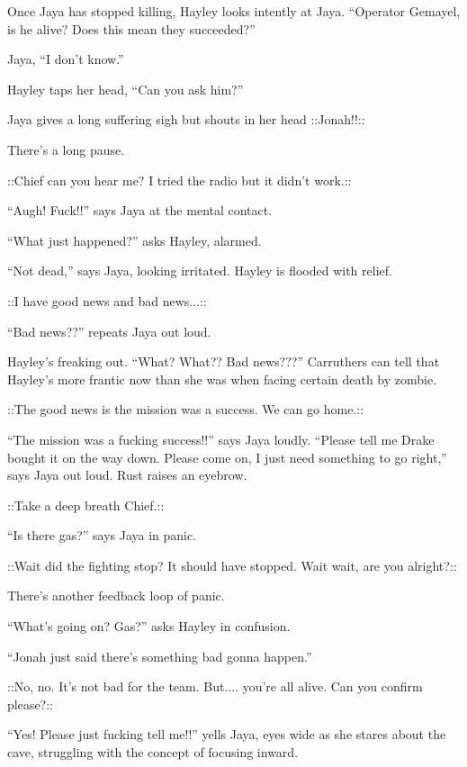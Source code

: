 
Once Jaya has stopped killing, Hayley looks intently at Jaya. ``Operator Gemayel, is he alive? Does this mean they succeeded?''

Jaya, ``I don't know.''

Hayley taps her head, ``Can you ask him?''

Jaya gives a long suffering sigh but shouts in her head  {\color[RGB]{255,0,0}::Jonah!!::} 

There's a long pause.  

 {\color[RGB]{74,134,232}::Chief can you hear me?  I tried the radio but it didn't work.::} 

``Augh!  Fuck!!'' says Jaya at the mental contact.

``What just happened?'' asks Hayley, alarmed.

``Not dead,'' says Jaya, looking irritated.  Hayley is flooded with relief.

 {\color[RGB]{74,134,232}::I have good news and bad news...::} 

``Bad news??'' repeats Jaya out loud.

Hayley's freaking out.  ``What?  What??  Bad news???''  Carruthers can tell that Hayley's more frantic now than she was when facing certain death by zombie.

 {\color[RGB]{74,134,232}::The good news is the mission was a success.  We can go home.::} 

``The mission was a fucking success!!'' says Jaya loudly.  ``Please tell me Drake bought it on the way down.  Please come on, I just need something to go right,'' says Jaya out loud.  Rust raises an eyebrow.

 {\color[RGB]{74,134,232}::Take a deep breath Chief.::} 

``Is there gas?'' says Jaya in panic.

 {\color[RGB]{74,134,232}::Wait did the fighting stop?  It should have stopped.  Wait wait, are you alright?::} 

There's another feedback loop of panic.

``What's going on?  Gas?'' asks Hayley in confusion.

``Jonah just said there's something bad gonna happen.''

 {\color[RGB]{74,134,232}::No, no.  It's not bad for the team.  But.... you're all alive. Can you confirm please?::} 

``Yes!  Please just fucking tell me!!'' yells Jaya, eyes wide as she stares about the cave, struggling with the concept of focusing inward.

